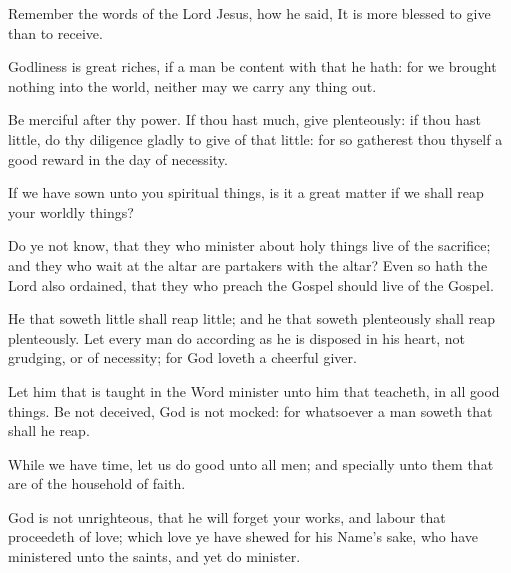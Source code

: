 Remember the words of the Lord Jesus, how he said, It is more blessed to give than to receive.

Godliness is great riches, if a man be content with that he hath: for we brought nothing into the world, neither may we carry any thing out.

Be merciful after thy power. If thou hast much, give plenteously: if thou hast little, do thy diligence gladly to give of that little: for so gatherest thou thyself a good reward in the day of necessity.



If we have sown unto you spiritual things, is it a great matter if we shall reap your worldly things?

Do ye not know, that they who minister about holy things live of the sacrifice; and they who wait at the altar are partakers with the altar? Even so hath the Lord also ordained, that they who preach the Gospel should live of the Gospel.

He that soweth little shall reap little; and he that soweth plenteously shall reap plenteously. Let every man do according as he is disposed in his heart, not grudging, or of necessity; for God loveth a cheerful giver.

Let him that is taught in the Word minister unto him that teacheth, in all good things. Be not deceived, God is not mocked: for whatsoever a man soweth that shall he reap.

While we have time, let us do good unto all men; and specially unto them that are of the household of faith.

God is not unrighteous, that he will forget your works, and labour that proceedeth of love; which love ye have shewed for his Name’s sake, who have ministered unto the saints, and yet do minister.

